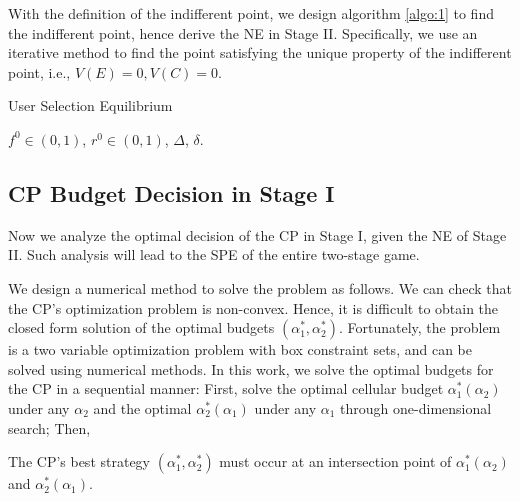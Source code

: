 With the definition of the indifferent point, we design algorithm \ref{algo:1} to find the indifferent point, hence derive the NE in Stage II. Specifically, we use an iterative method to find the point satisfying the unique property of the indifferent point, i.e., $V(E)=0, V(C)=0$.
    \begin{algorithm} \label{algo:1}
        \renewcommand{\algorithmicrequire}{\textbf{Initialization:}}
        \caption{User Selection Equilibrium}
        \begin{algorithmic}[1]
            \Require $f^0\in(0,1)$, $r^0\in(0,1)$, $\Delta$, $\delta$.

        \end{algorithmic}
    \end{algorithm}
\fi

\subsection{CP Budget Decision in Stage I}
Now we analyze the optimal decision of the CP in Stage I, given the NE of Stage II. Such analysis will lead to the SPE of the entire two-stage game.

We design a numerical method to solve the problem as follows.
We can check that the CP's optimization problem is non-convex. Hence, it is difficult to obtain the closed form solution of the optimal budgets $(\alpha_1^*, \alpha_2^*)$. Fortunately, the problem is a two variable optimization problem with box constraint sets, and can be solved using numerical methods. 
In this work, we solve the optimal budgets for the CP in a sequential manner: 
First, solve the optimal cellular budget 
$\alpha_1^*(\alpha_2)$ under any $\alpha_2$ and the optimal
$\alpha_2^*(\alpha_1)$ under any $\alpha_1$ through one-dimensional search; 
Then,
\begin{myPro}
The CP's best strategy $(\alpha_1^*, \alpha_2^*)$ must occur at an intersection point of $\alpha_1^*(\alpha_2)$ and $\alpha_2^*(\alpha_1)$.
\end{myPro}

